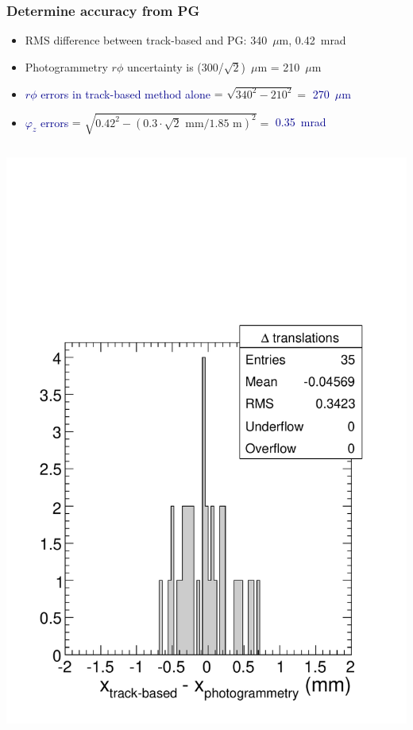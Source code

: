 \documentclass[compress]{beamer}
\begin{document}
\begin{frame}
\frametitle{Determine accuracy from PG}
\begin{itemize}
\item RMS difference between track-based and PG: 340~$\mu$m, 0.42~mrad
\item Photogrammetry $r\phi$ uncertainty is (300/$\sqrt{2}$)~$\mu$m = 210~$\mu$m
\item \textcolor{darkblue}{$r\phi$ errors in track-based method alone} = $\sqrt{340^2 - 210^2} =$ \textcolor{darkblue}{270~$\mu$m}
\item \textcolor{darkblue}{$\varphi_z$ errors} = $\sqrt{0.42^2 - (0.3\cdot\sqrt{2}\mbox{ mm}/1.85\mbox{ m})^2} =$ \textcolor{darkblue}{0.35~mrad}
\end{itemize}

\begin{columns}
\includegraphics[width=\linewidth]{delta_translations.pdf}

\end{columns}
\end{frame}
\end{document}
